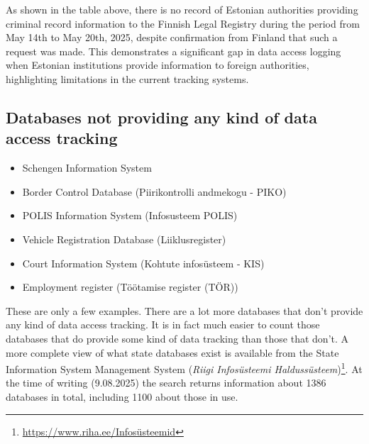 As shown in the table above, there is no record of Estonian authorities providing criminal record information to the Finnish Legal Registry during the period from May 14th to May 20th, 2025, despite confirmation from Finland that such a request was made. This demonstrates a significant gap in data access logging when Estonian institutions provide information to foreign authorities, highlighting limitations in the current tracking systems.


\subsection{Databases not providing any kind of data access tracking}
\begin{itemize}
    \item Schengen Information System
    \item Border Control Database (Piirikontrolli andmekogu - PIKO)
    \item POLIS Information System (Infosusteem POLIS)
    \item Vehicle Registration Database (Liiklusregister)
    \item Court Information System (Kohtute infosüsteem - KIS)
    \item Employment register (Töötamise register (TÖR))

\end{itemize}

These are only a few examples. There are a lot more databases that don't provide any kind of data access tracking. It is in fact much easier to count those databases that do provide some kind of data tracking than those that don't. A more complete view of what state databases exist is available from the State Information System Management System (\textit{Riigi Infosüsteemi Haldussüsteem})\footnote{\url{https://www.riha.ee/Infosüsteemid}}. At the time of writing (9.08.2025) the search returns information about 1386 databases in total, including 1100 about those in use.


